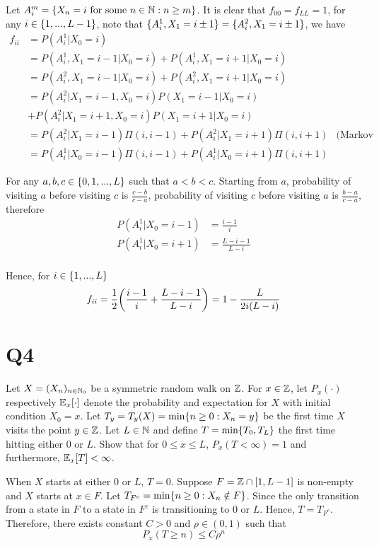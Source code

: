 \documentclass{article}
\begin{document}
Let $A_i^m = \{X_n = i \text{ for some } n \in \mathbb{N}: n \geq m\}$. It is clear that $f_{00} = f_{LL} = 1$, for any $i \in \{1, ..., L-1\}$, note that $\{A_i^1, X_1 = i\pm1\} = \{A_i^2, X_1 = i\pm1\}$, we have
\begin{align*}
    f_{ii}
    &= P(A_i^1 | X_0 = i) \\
    &= P(A_i^1, X_1 = i-1| X_0 = i) + P(A_i^1, X_1 = i+1| X_0 = i) \\
    &= P(A_i^2, X_1 = i-1| X_0 = i) + P(A_i^2, X_1 = i+1| X_0 = i) \\
    &= P(A_i^2 | X_1 = i-1, X_0 = i) P(X_1 = i-1| X_0 = i) \\ &+ P(A_i^2 | X_1 = i+1, X_0 = i) P(X_1 = i+1| X_0 = i)\\
    &= P(A_i^2 | X_1 = i-1) \Pi(i, i-1) + P(A_i^2 | X_1 = i+1) \Pi(i, i+1) &\text{(Markov property)} \\
    &= P(A_i^1 | X_0 = i-1) \Pi(i, i-1) + P(A_i^1 | X_0 = i+1) \Pi(i, i+1)
\end{align*}

For any $a, b, c \in \{0, 1, ..., L\}$ such that $a < b < c$. Starting from $a$, probability of visiting $a$ before visiting $c$ is $\frac{c-b}{c-a}$, probability of visiting $c$ before visiting $a$ is $\frac{b-a}{c-a}$, therefore
\begin{align*}
    P(A_i^1 | X_0 = i-1) &= \frac{i-1}{i} \\
    P(A_i^1 | X_0 = i+1) &= \frac{L-i-1}{L-i} \\
\end{align*}

Hence, for $i \in \{1, ..., L\}$
$$
    f_{ii} = \frac{1}{2} \tuple*{\frac{i-1}{i} + \frac{L-i-1}{L-i}} = 1 - \frac{L}{2i(L-i)}
$$


\section{Q4}

Let $X = (X_n)_{n \in \mathbb{N}_0}$ be a symmetric random walk on $\mathbb{Z}$. For $x \in \mathbb{Z}$, let $P_x(\cdot)$ respectively $\mathbb{E}_x[\cdot]$ denote the probability and expectation for $X$ with initial condition $X_0 = x$. Let $T_y = T_y(X) = \min\{n \geq 0: X_n = y\}$ be the first time $X$ visits the point $y \in \mathbb{Z}$. Let $L \in \mathbb{N}$ and define $T = \min\{T_0, T_L\}$ the first time hitting either $0$ or $L$. Show that for $0 \leq x \leq L$, $P_x(T < \infty) = 1$ and furthermore, $\mathbb{E}_x[T] < \infty$.

When $X$ starts at either $0$ or $L$, $T = 0$. Suppose $F = \mathbb{Z} \cap [1, L-1]$ is non-empty and $X$ starts at $x \in F$. Let $T_{F^c} = \min\{n \geq 0: X_n \notin F\}$. Since the only transition from a state in $F$ to a state in $F^c$ is transitioning to $0$ or $L$. Hence, $T = T_{F^c}$. Therefore, there exists constant $C > 0$ and $\rho \in (0, 1)$ such that
$$
    P_x(T \geq n) \leq C \rho^n
$$
\end{document}
